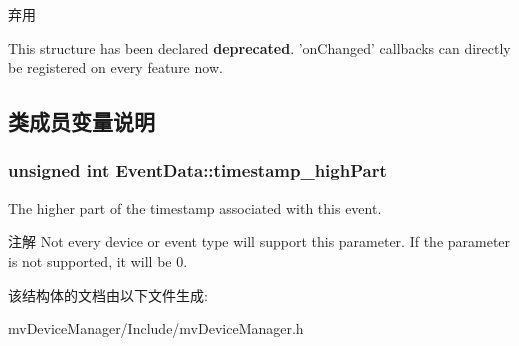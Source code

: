 \begin{DoxyRefDesc}{弃用}
\item[\hyperlink{deprecated__deprecated000005}{弃用}]This structure has been declared {\bfseries deprecated}. 'on\+Changed' callbacks can directly be registered on every feature now. \end{DoxyRefDesc}


\subsection{类成员变量说明}
\hypertarget{struct_event_data_ac643d73ddbad0bf59dc98edd3b7b478c}{
\subsubsection[{timestamp\+\_\+high\+Part}]{\setlength{\rightskip}{0pt plus 5cm}unsigned int Event\+Data\+::timestamp\+\_\+high\+Part}}\label{struct_event_data_ac643d73ddbad0bf59dc98edd3b7b478c}


The higher part of the timestamp associated with this event. 

\begin{DoxyNote}{注解}
Not every device or event type will support this parameter. If the parameter is not supported, it will be 0. 
\end{DoxyNote}


该结构体的文档由以下文件生成\+:\begin{DoxyCompactItemize}
\item 
mv\+Device\+Manager/\+Include/mv\+Device\+Manager.\+h\end{DoxyCompactItemize}
